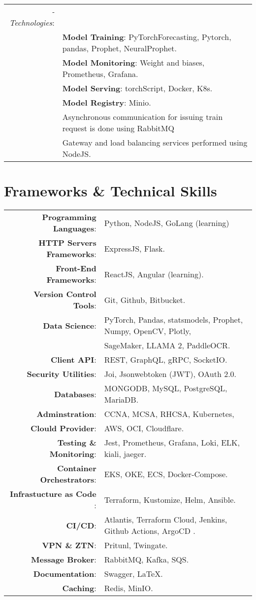 \documentclass[a4paper,10pt]{article}
\begin{document}
\begin{tabular}{r|l}
    \textit{-Technologies}:\\&
     \textbf{Model Training}: PyTorchForecasting, Pytorch, pandas, Prophet, NeuralProphet. \\&
     \textbf{Model Monitoring}: Weight and biases, Prometheus, Grafana.\\&
     \textbf{Model Serving}: torchScript, Docker, K8s. \\&
     \textbf{Model Registry}: Minio. \\&
    Asynchronous communication for issuing train request is done using RabbitMQ \\&
    Gateway and load balancing services performed using NodeJS. 
\\
\end{tabular}
\newpage
\section{\textbf{Frameworks \& Technical Skills}}

\begin{longtable}{r p{16cm}}	
    \textbf{Programming Languages}:& Python, NodeJS, GoLang (learning)\\
    \textbf{HTTP Servers Frameworks}:& ExpressJS, Flask.\\
    \textbf{Front-End Frameworks}:& ReactJS, Angular (learning).\\
    \textbf{Version Control Tools}:& Git, Github, Bitbucket.\\
    \textbf{Data Science}:& PyTorch, Pandas, statsmodels, Prophet, Numpy, OpenCV, Plotly,\\
    & SageMaker, LLAMA 2, PaddleOCR.\\
    \textbf{Client API}:& REST, GraphQL, gRPC, SocketIO.\\
    \textbf{Security Utilities}:& Joi, Jsonwebtoken (JWT), OAuth 2.0.\\ 
    \textbf{Databases}:& MONGODB, MySQL, PostgreSQL, MariaDB.\\
    \textbf{Adminstration}:& CCNA, MCSA, RHCSA, Kubernetes,\\
    \textbf{Clould Provider}:& AWS, OCI, Cloudflare. \\
    \textbf{Testing \& Monitoring}:& Jest, Prometheus, Grafana, Loki, ELK, kiali, jaeger.\\ 
    \textbf{Container Orchestrators}:& EKS, OKE, ECS, Docker-Compose. \\
    \textbf{Infrastucture as Code }:& Terraform, Kustomize, Helm, Ansible.\\
    \textbf{CI/CD}:& Atlantis, Terraform Cloud, Jenkins, Github Actions, ArgoCD .\\
    \textbf{VPN \& ZTN}:& Pritunl, Twingate. \\
    \textbf{Message Broker}:& RabbitMQ, Kafka, SQS.\\
    \textbf{Documentation}:& Swagger, \LaTeX.\\
    \textbf{Caching}:& Redis, MinIO.\\
\end{longtable}
\end{document}
